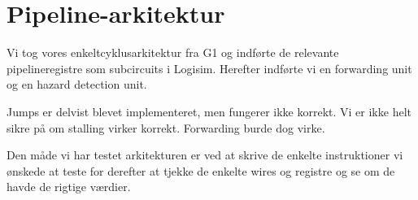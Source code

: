 \section{Pipeline-arkitektur}

Vi tog vores enkeltcyklusarkitektur fra G1 og indførte de relevante
pipelineregistre som subcircuits i Logisim. Herefter indførte vi en
forwarding unit og en hazard detection unit.

Jumps er delvist blevet implementeret, men fungerer ikke korrekt. Vi er ikke
helt sikre på om stalling virker korrekt. Forwarding burde dog virke.

Den måde vi har testet arkitekturen er ved at skrive de enkelte instruktioner
vi ønskede at teste for derefter at tjekke de enkelte wires og registre og se
om de havde de rigtige værdier.

%


%
